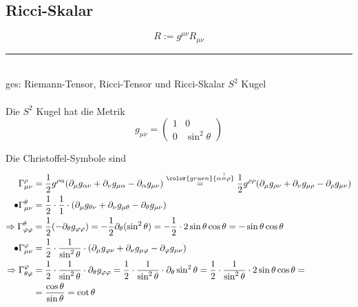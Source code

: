 \documentclass{article}
\newcommand{\comment}[1]{{\color{gruen} {#1}}}
\begin{document}
\subsection{Ricci-Skalar}
	\begin{equation}
		R := g^{\mu\nu}R_{\mu\nu}
	\end{equation}

\vspace{0.5cm}

{\color{blue}
\hrule
	\\
	ges: Riemann-Tensor, Ricci-Tensor und Ricci-Skalar $S^2$ Kugel\\
	\\
	Die $S^2$ Kugel hat die Metrik
		$$g_{\mu\nu} =
		\begin{pmatrix}
			1 & 0 \\
			0 & \sin^2\theta
		\end{pmatrix}$$

	Die Christoffel-Symbole sind
		\begin{align*}
			\Gamma^\rho_{\mu\nu} &= \frac{1}{2}g^{\rho\alpha} (\partial_\mu g_{\alpha\nu} + \partial_\nu g_{\mu\alpha} - \partial_\alpha g_{\mu\nu}) \stackrel{\comment{\alpha \stackrel{!}{=} \rho}}{=} \frac{1}{2}g^{\rho\rho} (\partial_\mu g_{\rho\nu} + \partial_\nu g_{\mu\rho} - \partial_\rho g_{\mu\nu}) \\
			\bullet \Gamma^\theta_{\mu\nu} &= \frac{1}{2} \cdot \frac{1}{1} \cdot (\partial_\mu g_{\theta\nu} + \partial_\nu g_{\mu\theta} - \partial_\theta g_{\mu\nu}) \\
			\Rightarrow \Gamma^\theta_{\varphi\varphi} &= \frac{1}{2} (-\partial_\theta g_{\varphi\varphi}) = -\frac{1}{2} \partial_\theta (\sin^2\theta) = -\frac{1}{2} \cdot 2\sin\theta\cos\theta = -\sin\theta\cos\theta \\
			\bullet \Gamma^\varphi_{\mu\nu} &= \frac{1}{2} \cdot \frac{1}{\sin^2\theta} \cdot (\partial_\mu g_{\varphi\nu} + \partial_\nu g_{\mu\varphi} - \partial_\varphi g_{\mu\nu}) \\
			\Rightarrow \Gamma^\varphi_{\theta\varphi} &= \frac{1}{2} \cdot \frac{1}{\sin^2\theta} \cdot \partial_\theta g_{\varphi\varphi} = \frac{1}{2} \cdot \frac{1}{\sin^2\theta} \cdot \partial_\theta \sin^2\theta = \frac{1}{2} \cdot \frac{1}{\sin^2\theta} \cdot 2\sin\theta\cos\theta = \\
			&= \frac{\cos\theta}{\sin\theta} = \cot\theta
		\end{align*}
	
	\dotfill
	
}
\end{document}
